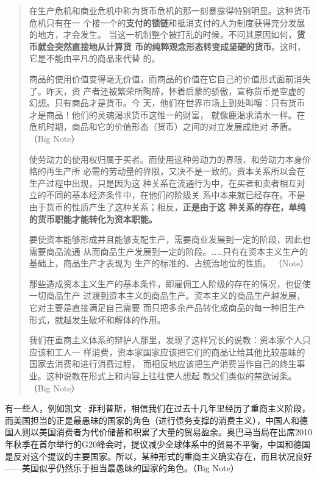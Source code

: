 \begin{quotation}
  在生产危机和商业危机中称为货币危机的那一刻暴露得特别明显。这种货币危机只有在一
  个接一个的\textbf{支付的锁链}和抵消支付的人为制度获得充分发展的地方，才会发生。
  当这一机制整个被打乱的时候，不问其原因如何，\textbf{货币就会突然直接地从计算货
    币的纯粹观念形态转变成坚硬的货币}。这时，它是不能由平凡的商品来代替
  的。

  商品的使用价值变得毫无价值，而商品的价值在它自己的价值形式面前消失了。昨天，资
  产者还被繁荣所陶醉，怀着启蒙的骄傲，宣称货币是空虚的幻想。只有商品才是货币。今
  天，他们在世界市场上到处叫嚷：只有货币才是商品！他们的灵魂渴求货币这惟一的财富，
  就像鹿渴求清水一样。在危机时期，商品和它的价值形态（货币）之间的对立发展成绝对
  矛盾。 （Big Note）

  使劳动力的使用权归属于买者。而使用这种劳动力的界限，和劳动力本身价格的再生产所
  必需的劳动量的界限，又决不是一致的。资本关系所以会在生产过程中出现，只是因为这
  种关系在流通行为中，在买者和卖者相互对立的不同的基本经济条件中，在他们的阶级关
  系中本来就已经存在。不是由于货币的性质产生了这种关系；相反，\textbf{正是由于这
    种关系的存在，单纯的货币职能才能转化为资本职能。}

  要使资本能够形成并且能够支配生产，需要商业发展到一定的阶段，因此也需要商品流通
  从而商品生产发展到一定的阶段。……只有在资本主义生产的基础上，商品生产才表现为
  生产的标准的、占统治地位的性质。 （Note）

  那些造成资本主义生产的基本条件，即雇佣工人阶级的存在的情况，也促使一切商品生产
  过渡到资本主义的商品生产。资本主义的商品生产越发展，它对主要是直接满足自己需要
  而只把多余产品转化成商品的每一种旧生产形式，就越发生破坏和解体的作用。 

  我们在重商主义体系的辩护人那里，发现了这样冗长的说教：资本家个人只应该和工人一
  样消费，资本家国家应该把它们的商品让给其他比较愚昧的国家去消费和进行消费过程，
  而相反地应该把生产消费当作自己的终生事业。这种说教在形式上和内容上往往使人想起
  教父们类似的禁欲诫条。 （Big Note）

\end{quotation}
有一些人，例如凯文·菲利普斯，相信我们在过去十几年里经历了重商主义阶段，而美国担当的正是最愚昧的国家的角色（进行债务支撑的消费主义），中国人和德国人则以美国消费者为代价储蓄和积累了大量的贸易盈余。奥巴马当局在出席2010年秋季在首尔举行的G20峰会时，提议减少全球体系中的贸易不平衡，中国和德国是反对这个提议的主要国家。所以，某种形式的重商主义确实存在，而且状况良好——美国似乎仍然乐于担当最愚昧的国家的角色。（Big Note）

